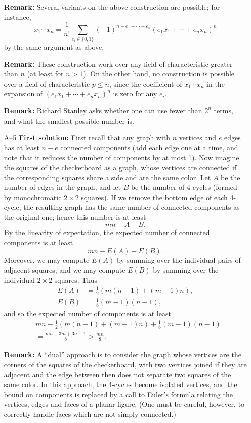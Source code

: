 \documentclass[amssymb,twocolumn,pra,10pt,aps]{revtex4-1}
\begin{document}
\begin{itemize}
\textbf{Remark:} Several variants on the above construction
are possible; for instance,
\[
x_1 \cdots x_n = \frac{1}{n!}
\sum_{e_i \in \{0,1\}} (-1)^{n - e_1 - \cdots - e_n}
(e_1 x_1 + \cdots + e_n x_n)^n
\]
by the same argument as above.

\textbf{Remark:} These construction work over any field of characteristic
greater than $n$ (at least for $n>1$).
On the other hand, no construction is possible over
a field of characteristic $p \leq n$, since the coefficient of
$x_1\cdots x_n$ in the expansion of
$(e_1 x_1 + \cdots + e_n x_n)^n$ is zero for any $e_i$.

\textbf{Remark:} Richard Stanley asks whether one can use fewer than
$2^n$ terms, and what the smallest possible number is.

\item[A--5]
\textbf{First solution:}
First recall that any graph with $n$ vertices and $e$ edges has at
least $n-e$ connected components (add each edge one at a time, and note
that it reduces the number of components by at most 1). Now
imagine the squares of the checkerboard as a graph, whose vertices are
connected if the corresponding squares share a side and are
the same color. Let
$A$ be the number of edges in the graph, and let $B$ be the number of
4-cycles (formed by monochromatic $2 \times 2$ squares).
If we remove the bottom edge of each 4-cycle, the resulting graph has
the same number of connected components as the original one;
hence this number is at least
\[
mn - A+B.
\]
By the linearity of expectation, the expected number of connected
components is at least
\[
mn - E(A) + E(B).
\]
Moreover, we may compute $E(A)$ by summing over the individual
pairs of adjacent squares, and we may compute $E(B)$ by summing over
the individual $2 \times 2$ squares. Thus
\begin{align*}
E(A) &= \frac{1}{2}(m(n-1) + (m-1)n), \\
E(B) &= \frac{1}{8}(m-1)(n-1),
\end{align*}
and so the expected number of components is at least
\begin{align*}
& mn - \frac{1}{2}(m(n-1)+(m-1)n) + \frac{1}{8}(m-1)(n-1) \\
&= \frac{mn + 3m + 3n + 1}{8} >
\frac{mn}{8}.
\end{align*}

\textbf{Remark:}
A ``dual'' approach is to consider
the graph whose vertices are the corners of the squares of the checkerboard,
with two vertices joined if they are adjacent and the edge between then
does not separate two squares of the same color. In this approach,
the 4-cycles become isolated vertices, and the bound on components
is replaced by a call to Euler's formula relating the vertices, edges
and faces of a planar figure. (One must be careful, however, to correctly
handle faces which are not simply connected.)


\end{itemize}
\end{document}
